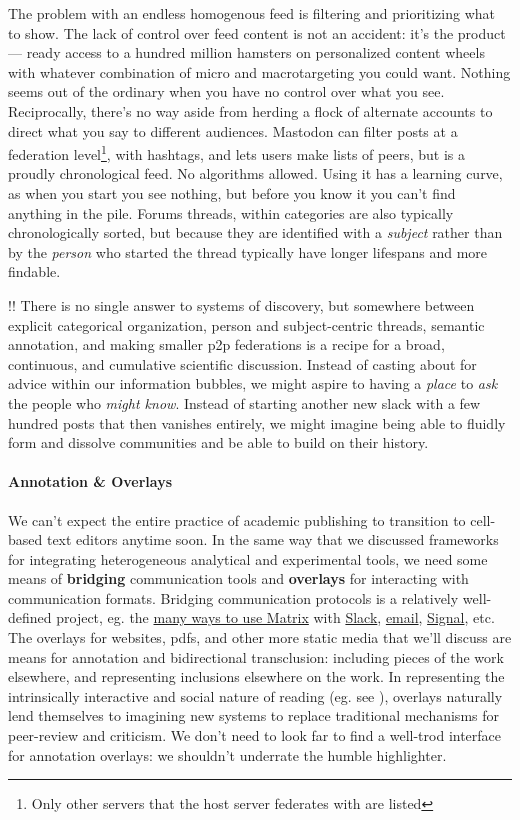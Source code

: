\documentclass[10pt]{tufte-book}
\begin{document}
The problem with an endless homogenous feed is filtering and
prioritizing what to show. The lack of control over feed content is not
an accident: it's the product --- ready access to a hundred million
hamsters on personalized content wheels with whatever combination of
micro and macrotargeting you could want. Nothing seems out of the
ordinary when you have no control over what you see. Reciprocally,
there's no way aside from herding a flock of alternate accounts to
direct what you say to different audiences. Mastodon can filter posts at
a federation level\footnote{Only other servers that the host server
  federates with are listed}, with hashtags, and lets users make lists
of peers, but is a proudly chronological feed. No algorithms allowed.
Using it has a learning curve, as when you start you see nothing, but
before you know it you can't find anything in the pile. Forums threads,
within categories are also typically chronologically sorted, but because
they are identified with a \emph{subject} rather than by the
\emph{person} who started the thread typically have longer lifespans and
more findable.

!! There is no single answer to systems of discovery, but somewhere
between explicit categorical organization, person and subject-centric
threads, semantic annotation, and making smaller p2p federations is a
recipe for a broad, continuous, and cumulative scientific discussion.
Instead of casting about for advice within our information bubbles, we
might aspire to having a \emph{place} to \emph{ask} the people who
\emph{might know}. Instead of starting another new slack with a few
hundred posts that then vanishes entirely, we might imagine being able
to fluidly form and dissolve communities and be able to build on their
history.


\paragraph{Annotation \& Overlays}

We can't expect the entire practice of academic publishing to transition
to cell-based text editors anytime soon. In the same way that we
discussed frameworks for integrating heterogeneous analytical and
experimental tools, we need some means of \textbf{bridging}
communication tools and \textbf{overlays} for interacting with
communication formats. Bridging communication protocols is a relatively
well-defined project, eg. the \href{https://matrix.org/bridges/}{many
ways to use Matrix} with
\href{https://matrix.org/bridges/\#slack}{Slack},
\href{https://matrix.org/bridges/\#email}{email},
\href{https://matrix.org/bridges/\#signal}{Signal}, etc. The overlays
for websites, pdfs, and other more static media that we'll discuss are
means for annotation and bidirectional transclusion: including pieces of
the work elsewhere, and representing inclusions elsewhere on the work.
In representing the intrinsically interactive and social nature of
reading (eg. see \citep{jacksonMarginaliaReadersWriting2001} ),
overlays naturally lend themselves to imagining new systems to replace
traditional mechanisms for peer-review and criticism. We don't need to
look far to find a well-trod interface for annotation overlays: we
shouldn't underrate the humble highlighter.
\end{document}
